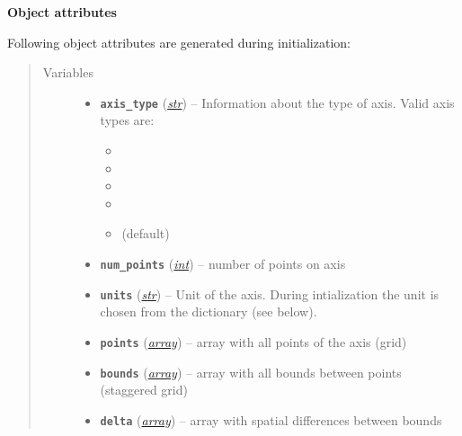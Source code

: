 \documentclass[letterpaper,10pt,english]{sphinxmanual}
\begin{document}
\begin{fulllineitems}
\textbf{Object attributes}

Following object attributes are generated during initialization:
\begin{quote}\begin{description}
\item[{Variables}] \leavevmode\begin{itemize}
\item {} 
\textbf{\texttt{axis\_type}} (\href{http://docs.python.org/2.7/library/functions.html\#str}{\emph{str}}) -- 
Information about the type of axis. Valid axis types are:
\begin{itemize}
\item {} 

\item {} 

\item {} 

\item {} 

\item {} 
 (default)

\end{itemize}


\item {} 
\textbf{\texttt{num\_points}} (\href{http://docs.python.org/2.7/library/functions.html\#int}{\emph{int}}) -- number of points on axis

\item {} 
\textbf{\texttt{units}} (\href{http://docs.python.org/2.7/library/functions.html\#str}{\emph{str}}) -- Unit of the axis. During intialization the unit is 
chosen from the  dictionary (see below).

\item {} 
\textbf{\texttt{points}} (\href{http://docs.python.org/2.7/library/array.html\#module-array}{\emph{array}}) -- array with all points of the axis (grid)

\item {} 
\textbf{\texttt{bounds}} (\href{http://docs.python.org/2.7/library/array.html\#module-array}{\emph{array}}) -- array with all bounds between points (staggered grid)

\item {} 
\textbf{\texttt{delta}} (\href{http://docs.python.org/2.7/library/array.html\#module-array}{\emph{array}}) -- array with spatial differences between bounds

\end{itemize}


\end{description}
\end{quote}
\end{fulllineitems}
\end{document}

